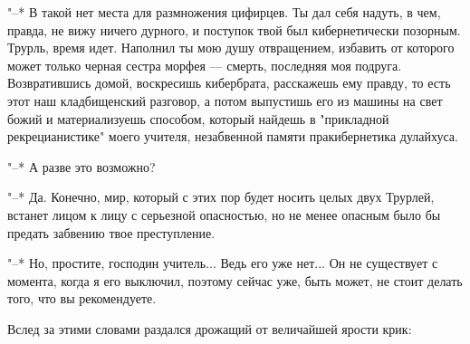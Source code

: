 "--* В такой нет места для размножения цифирцев. Ты дал
себя надуть, в чем, правда, не вижу ничего дурного, и
поступок твой был кибернетически позорным. Трурль, время
идет. Наполнил ты мою душу отвращением, избавить от которого
может только черная сестра морфея --- смерть, последняя моя
подруга. Возвратившись домой, воскресишь кибербрата,
расскажешь ему правду, то есть этот наш кладбищенский
разговор, а потом выпустишь его из машины на свет божий и
материализуешь способом, который найдешь в "прикладной
рекрецианистике" моего учителя, незабвенной памяти
пракибернетика дулайхуса.

"--* А разве это возможно?

"--* Да. Конечно, мир, который с этих пор будет носить
целых двух Трурлей, встанет лицом к лицу с серьезной
опасностью, но не менее опасным было бы предать забвению
твое преступление.

"--* Но, простите, господин учитель... Ведь его уже нет...
Он не существует с момента, когда я его выключил, поэтому
сейчас уже, быть может, не стоит делать того, что вы
рекомендуете.

Вслед за этими словами раздался дрожащий от величайшей
ярости крик:

